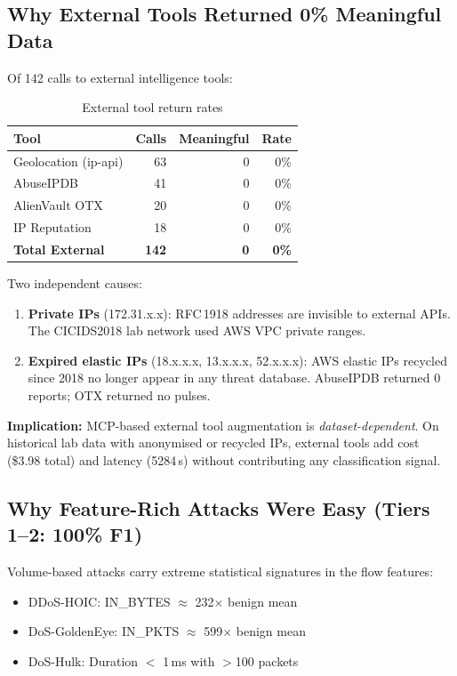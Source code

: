 \documentclass[12pt, a4paper, oneside]{report}
\begin{document}
\subsection{Why External Tools Returned 0\% Meaningful Data}

Of 142 calls to external intelligence tools:

\begin{table}[H]
\centering
\caption{External tool return rates}
\label{tab:external-tools}
\begin{tabular}{@{}lrrr@{}}
\toprule
\textbf{Tool} & \textbf{Calls} & \textbf{Meaningful} & \textbf{Rate} \\
\midrule
Geolocation (ip-api)  & 63 & 0 & 0\% \\
AbuseIPDB             & 41 & 0 & 0\% \\
AlienVault OTX        & 20 & 0 & 0\% \\
IP Reputation         & 18 & 0 & 0\% \\
\midrule
\textbf{Total External} & \textbf{142} & \textbf{0} & \textbf{0\%} \\
\bottomrule
\end{tabular}
\end{table}

Two independent causes:
\begin{enumerate}
  \item \textbf{Private IPs} (172.31.x.x): RFC\,1918 addresses are invisible to
        external APIs. The CICIDS2018 lab network used AWS VPC private ranges.
  \item \textbf{Expired elastic IPs} (18.x.x.x, 13.x.x.x, 52.x.x.x): AWS
        elastic IPs recycled since 2018 no longer appear in any threat database.
        AbuseIPDB returned 0 reports; OTX returned no pulses.
\end{enumerate}

\textbf{Implication:} MCP-based external tool augmentation is
\emph{dataset-dependent}. On historical lab data with anonymised or recycled IPs,
external tools add cost (\$3.98 total) and latency (5284\,s) without contributing
any classification signal.

\subsection{Why Feature-Rich Attacks Were Easy (Tiers 1--2: 100\% F1)}

Volume-based attacks carry extreme statistical signatures in the flow features:
\begin{itemize}
  \item DDoS-HOIC: IN\_BYTES $\approx$ 232$\times$ benign mean
  \item DoS-GoldenEye: IN\_PKTS $\approx$ 599$\times$ benign mean
  \item DoS-Hulk: Duration $<$ 1\,ms with $>$100 packets
\end{itemize}
\end{document}
